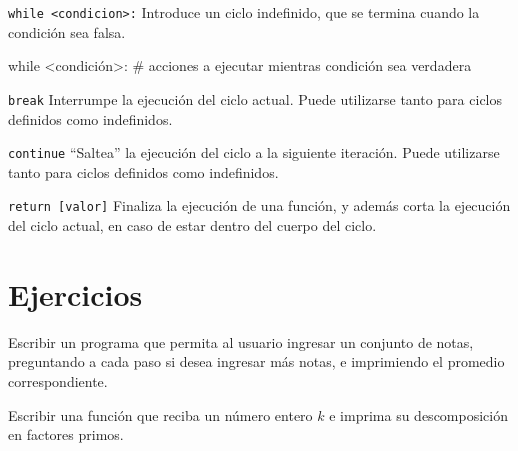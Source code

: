 \begin{referencia_python}

\begin{sintaxis}{\lstinline!while <condicion>:!}
Introduce un ciclo indefinido, que se termina cuando la condición sea falsa.
\begin{codigo-python-sn}
while <condición>:
    # acciones a ejecutar mientras condición sea verdadera
\end{codigo-python-sn}
\end{sintaxis}

\begin{sintaxis}{\lstinline!break!}
Interrumpe la ejecución del ciclo actual. Puede utilizarse tanto para ciclos
definidos como indefinidos.
\end{sintaxis}

\begin{sintaxis}{\lstinline!continue!}
``Saltea'' la ejecución del ciclo a la siguiente iteración. Puede utilizarse
tanto para ciclos definidos como indefinidos.
\end{sintaxis}

\begin{sintaxis}{\lstinline!return [valor]!}
Finaliza la ejecución de una función, y además corta la ejecución del ciclo
actual, en caso de estar dentro del cuerpo del ciclo.
\end{sintaxis}
\end{referencia_python}

\newpage
\section{Ejercicios}

\begin{ejercicio}
Escribir un programa que permita al usuario ingresar un conjunto de notas,
preguntando a cada paso si desea ingresar más notas, e imprimiendo el
promedio correspondiente.
\end{ejercicio}

\begin{ejercicio}
Escribir una función que reciba un número entero $k$ e imprima su
descomposición en factores primos.
\end{ejercicio}


